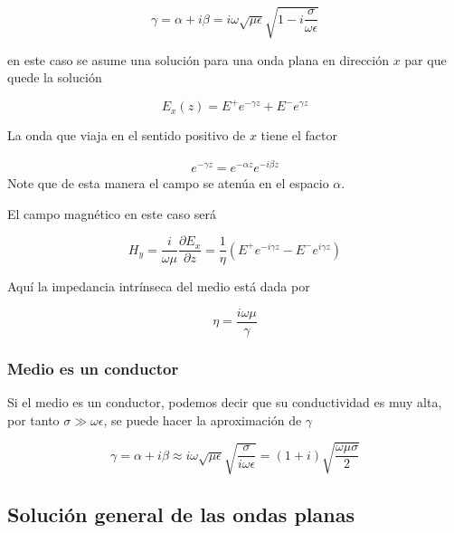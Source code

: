 \begin{equation*}
\gamma = \alpha + i \beta = i \omega \sqrt{\mu \epsilon} \sqrt{1-i \frac{\sigma}{\omega \epsilon}}
\end{equation*}

en este caso se asume una solución para una onda plana en dirección $x$ par que quede la solución

\begin{equation*}
E_x(z) = E^+ e^{-\gamma z} + E^- e^{\gamma z}
\end{equation*}

La onda que viaja en el sentido positivo de $x$ tiene el factor

\begin{eqnarray*}
e^{- \gamma z} = e^{- \alpha z} e ^{-i \beta z}
\end{eqnarray*}
Note que de esta manera el campo se atenúa en el espacio $\alpha$.

El campo magnético en este caso será

\begin{equation*}
H_y = \frac{i}{\omega \mu} \frac{\partial E_x}{\partial z} = \frac{1}{\eta} (  E^+ e^{-i \gamma z} - E^- e^{i \gamma z} )
\end{equation*}

Aquí la impedancia intrínseca del medio está dada por

\begin{equation*}
\eta = \frac{i \omega \mu}{\gamma}
\end{equation*}

\subsubsection*{Medio es un conductor}

Si el medio es un conductor, podemos decir que su conductividad es muy alta, por tanto $\sigma \gg \omega \epsilon$, se puede hacer la aproximación de $\gamma$


\begin{equation*}
\gamma = \alpha + i \beta \approx i \omega \sqrt{\mu \epsilon} \sqrt{ \frac{\sigma}{i \omega \epsilon}} = (1 + i) \sqrt{\frac{\omega \mu \sigma}{2}}
\end{equation*}

\subsection{Solución general de las ondas planas}

